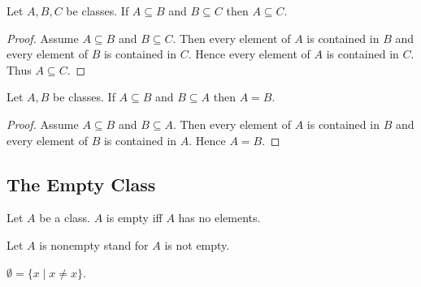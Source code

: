 \documentclass[10pt]{article}
\begin{document}
  \begin{forthel}
    \begin{proposition}
      Let $A, B, C$ be classes.
      If $A \subseteq B$ and $B \subseteq C$ then $A \subseteq C$.
    \end{proposition}
    \begin{proof}
      Assume $A \subseteq B$ and $B \subseteq C$.
      Then every element of $A$ is contained in $B$ and every element of $B$ is contained in $C$.
      Hence every element of $A$ is contained in $C$.
      Thus $A \subseteq C$.
    \end{proof}
  \end{forthel}

  \begin{forthel}
    \begin{proposition}
      Let $A, B$ be classes.
      If $A \subseteq B$ and $B \subseteq A$ then $A = B$.
    \end{proposition}
    \begin{proof}
      Assume $A \subseteq B$ and $B \subseteq A$.
      Then every element of $A$ is contained in $B$ and every element of $B$ is contained in $A$.
      Hence $A = B$.
    \end{proof}
  \end{forthel}


  \subsection*{The Empty Class}

  \begin{forthel}
    \begin{definition}
      Let $A$ be a class.
      $A$ is empty iff $A$ has no elements.
    \end{definition}

    Let $A$ is nonempty stand for $A$ is not empty.
  \end{forthel}

  \begin{forthel}
    \begin{definition}
      $\emptyset = \{ x \mid x \neq x \}$.
    \end{definition}
  \end{forthel}
\end{document}
